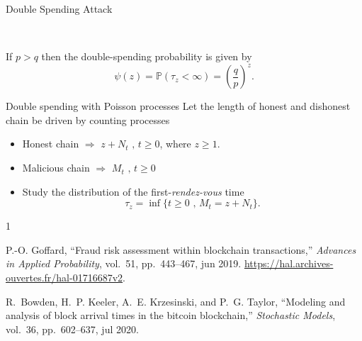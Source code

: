 \documentclass{beamer}
\begin{document}
\begin{frame}{Double Spending Attack}
\begin{tikzpicture}
\end{tikzpicture}\\

\scriptsize
\begin{tcolorbox}[enhanced,drop shadow, title=Double spending theorem]
If $p>q$ then the double-spending probability is given by
$$
\psi(z) = \mathbb{P}(\tau_z<\infty)=\left(\frac{q}{p}\right)^{z}.
$$
\end{tcolorbox}


\end{frame}
\begin{frame}{Double spending with Poisson processes}
\scriptsize
Let the length of honest and dishonest chain be driven by counting processes
\begin{itemize}
\item Honest chain $\Rightarrow$ $z+N_t\text{ , }t\geq0$, where $z\geq1$.
\item Malicious chain $\Rightarrow$ $M_t\text{ , }t\geq0$
\item Study the distribution of the first-\textit{rendez-vous} time
$$
\tau_z=\inf\{t\geq0\text{ , } M_t=z+N_t\}.
$$
\end{itemize}

\tiny
\begin{thebibliography}{1}

P.-O. Goffard, ``Fraud risk assessment within blockchain transactions,'' {\em
  Advances in Applied Probability}, vol.~51, pp.~443--467, jun 2019.
\newblock \url{https://hal.archives-ouvertes.fr/hal-01716687v2}.

R.~Bowden, H.~P. Keeler, A.~E. Krzesinski, and P.~G. Taylor, ``Modeling and
  analysis of block arrival times in the bitcoin blockchain,'' {\em Stochastic
  Models}, vol.~36, pp.~602--637, jul 2020.
\end{thebibliography}

\end{frame}
\end{document}
